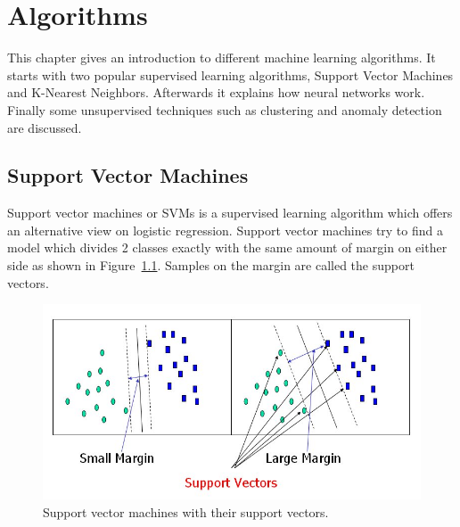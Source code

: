 \chapter{Algorithms}
\label{algorithms}
This chapter gives an introduction to different machine learning algorithms. It starts with two popular supervised learning algorithms, Support Vector Machines and K-Nearest Neighbors. Afterwards it explains how neural networks work. Finally some unsupervised techniques such as clustering and anomaly detection are discussed. 

\section{Support Vector Machines}
Support vector machines or SVMs is a supervised learning algorithm which offers an alternative view on logistic regression. Support vector machines try to find a model which divides 2 classes exactly with the same amount of margin on either side as shown in Figure~\ref{fig:svm}. Samples on the margin are called the support vectors.
\begin{figure}[H]
\centering
\includegraphics[width=\textwidth]{Figures/svm}
\decoRule
\caption[Support Vector Machines]{Support vector machines with their support vectors. \cite{svm}}
\label{fig:svm}
\end{figure}

